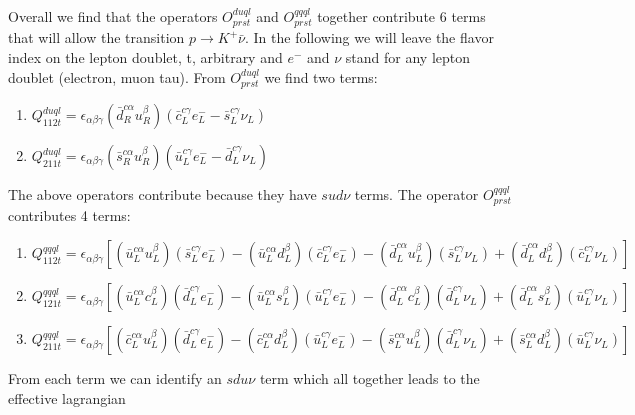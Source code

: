 \documentclass[aps,onecolumn,twoside,secnumarabic,balancelastpage,amsmath,amssymb,nofootinbib,hyperref=pdftex]{revtex4}
\begin{document}
Overall we find that the operators $O^{duql}_{prst}$ and $O^{qqql}_{prst}$ together contribute 6 terms that will allow the transition $p \rightarrow K^{+}\bar{\nu}$. In the following we will leave the flavor index on the lepton doublet, t, arbitrary and $e^{-}$ and $\nu$ stand for any lepton doublet (electron, muon tau). From $O^{duql}_{prst}$ we find two terms:

\begin{enumerate}
\item $Q^{duql}_{112t} = \epsilon_{\alpha\beta\gamma}(\bar{d}_{R}^{c\alpha}u_{R}^{\beta})(\bar{c}_{L}^{c\gamma}e_{L}^{-} - \bar{s}_{L}^{c\gamma}\nu_{L})$
\item $Q^{duql}_{211t} = \epsilon_{\alpha\beta\gamma}(\bar{s}_{R}^{c\alpha}u_{R}^{\beta})(\bar{u}_{L}^{c\gamma}e_{L}^{-} - \bar{d}_{L}^{c\gamma}\nu_{L})$
\end{enumerate}
 
The above operators contribute because they have $sud\nu$ terms. The operator $O^{qqql}_{prst}$ contributes 4 terms:

\begin{enumerate}
\item $Q^{qqql}_{112t} = \epsilon_{\alpha\beta\gamma}[(\bar{u}_{L}^{c\alpha}u_{L}^{\beta})(\bar{s}_{L}^{c\gamma}e_{L}^{-}) - (\bar{u}_{L}^{c\alpha}d_{L}^{\beta})(\bar{c}_{L}^{c\gamma}e_{L}^{-}) - (\bar{d}_{L}^{c\alpha}u_{L}^{\beta})(\bar{s}_{L}^{c\gamma}\nu_{L}) + (\bar{d}_{L}^{c\alpha}d_{L}^{\beta})(\bar{c}_{L}^{c\gamma}\nu_{L})]$

\item $Q^{qqql}_{121t} = \epsilon_{\alpha\beta\gamma}[(\bar{u}^{c\alpha}_{L}c^{\beta}_{L})(\bar{d}^{c\gamma}_{L}e^{-}_{L}) - (\bar{u}^{c\alpha}_{L}s^{\beta}_{L})(\bar{u}^{c\gamma}_{L}e^{-}_{L}) - (\bar{d}^{c\alpha}_{L}c^{\beta}_{L})(\bar{d}^{c\gamma}_{L}\nu_{L}) + (\bar{d}^{c\alpha}_{L}s^{\beta}_{L})(\bar{u}^{c\gamma}_{L}\nu_{L})]$

\item $Q^{qqql}_{211t} =  \epsilon_{\alpha\beta\gamma}[(\bar{c}^{c\alpha}_{L}u^{\beta}_{L})(\bar{d}^{c\gamma}_{L}e^{-}_{L}) - (\bar{c}^{c\alpha}_{L}d^{\beta}_{L})(\bar{u}^{c\gamma}_{L}e^{-}_{L}) - (\bar{s}^{c\alpha}_{L}u^{\beta}_{L})(\bar{d}^{c\gamma}_{L}\nu_{L}) + (\bar{s}^{c\alpha}_{L}d^{\beta}_{L})(\bar{u}^{c\gamma}_{L}\nu_{L})]$

\end{enumerate}

From each term we can identify an $sdu\nu$ term which all together leads to the effective lagrangian
\end{document}
